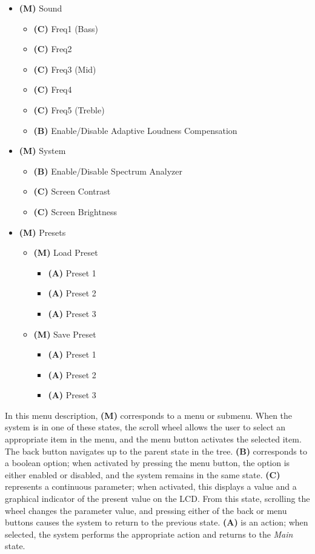\begin{itemize}

\item \textbf{(M)} Sound
\begin{itemize}
	\item \textbf{(C)} Freq1 (Bass)
	\item \textbf{(C)} Freq2
	\item \textbf{(C)} Freq3 (Mid)
	\item \textbf{(C)} Freq4
	\item \textbf{(C)} Freq5 (Treble)
	\item \textbf{(B)} Enable/Disable Adaptive Loudness Compensation
\end{itemize}

\item \textbf{(M)} System
\begin{itemize}
	\item \textbf{(B)} Enable/Disable Spectrum Analyzer
	\item \textbf{(C)} Screen Contrast
	\item \textbf{(C)} Screen Brightness
\end{itemize}

\item \textbf{(M)} Presets
\begin{itemize}
	\item \textbf{(M)} Load Preset
	\begin{itemize}
		\item \textbf{(A)} Preset 1
		\item \textbf{(A)} Preset 2
		\item \textbf{(A)} Preset 3
	\end{itemize}

	\item \textbf{(M)} Save Preset
	\begin{itemize}
		\item \textbf{(A)} Preset 1
		\item \textbf{(A)} Preset 2
		\item \textbf{(A)} Preset 3
	\end{itemize}
\end{itemize}

\end{itemize}

In this menu description, \textbf{(M)} corresponds to a menu or submenu. When the system is in one of these states, the scroll wheel allows the user to select an appropriate item in the menu, and the menu button activates the selected item. The back button navigates up to the parent state in the tree. \textbf{(B)} corresponds to a boolean option; when activated by pressing the menu button, the option is either enabled or disabled, and the system remains in the same state. \textbf{(C)} represents a continuous parameter; when activated, this displays a value and a graphical indicator of the present value on the LCD. From this state, scrolling the wheel changes the parameter value, and pressing either of the back or menu buttons causes the system to return to the previous state. \textbf{(A)} is an action; when selected, the system performs the appropriate action and returns to the \emph{Main} state.

